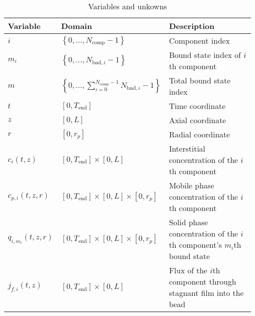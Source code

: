 \begin{table}[!hptb]
\centering
\begin{tabular}{llp{8cm}}
\toprule
Variable & Domain & Description \\
\midrule
$i$ & $\left\{ 0, \dots, N_{\text{comp}} - 1 \right\}$ & Component index\\
$m_i$ & $\left\{ 0, \dots, N_{\text{bnd},i} - 1 \right\}$ & Bound state index of $i$th component\\
$m$ & $\left\{ 0, \dots, \sum_{i=0}^{N_{\text{comp}}-1} N_{\text{bnd},i} - 1 \right\}$ & Total bound state index\\
$t$ & $\left[0, T_{\text{end}}\right]$ & Time coordinate\\
$z$ & $[0, L]$ & Axial coordinate\\
$r$ & $\left[0, r_p\right]$ & Radial coordinate\\
$c_{i}(t,z)$ & $\left[0, T_{\text{end}}\right] \times [0, L]$ & Interstitial concentration of the $i$th component\\
$c_{p,i}(t, z, r)$ & $\left[0, T_{\text{end}}\right] \times [0, L] \times \left[0, r_p\right]$ & Mobile phase concentration of the $i$th component\\
$q_{i,m_i}(t, z, r)$ & $\left[0, T_{\text{end}}\right] \times [0,L] \times \left[0, r_p\right]$ & Solid phase concentration of the $i$th component's $m_i$th bound state\\
$j_{f,i}(t, z)$ & $\left[0, T_{\text{end}}\right] \times [0, L]$ & Flux of the $i$th component through stagnant film into the bead\\
\bottomrule
\end{tabular}
\caption{Variables and unkowns}
\end{table}

